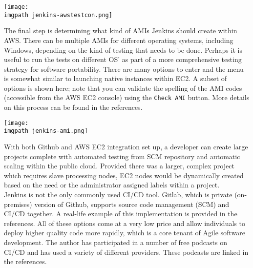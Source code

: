     \begin{minipage}[t]{\linewidth}
	  \centering
      \texttt{[image: \\imgpath jenkins-awstestcon.png]}
    \end{minipage}

The final step is determining what kind of AMIs Jenkins should create within
AWS\@. There can be multiple AMIs for different operating systems, including
Windows, depending on the kind of testing that needs to be done. Perhaps it is
useful to run the tests on different OS' as part of a more comprehensive
testing strategy for software portability. There are many options to enter and
the menu is somewhat similar to launching native instances within EC2. A
subset of options is shown here; note that you can validate the spelling of
the AMI codes (accessible from the AWS EC2 console) using the \verb|Check AMI|
button. More details on this process can be found in the references.

    \begin{minipage}[t]{\linewidth}
	  \centering
      \texttt{[image: \\imgpath jenkins-ami.png]}
    \end{minipage}

With both Github and AWS EC2 integration set up, a developer can create large
projects complete with automated testing from SCM repository and automatic
scaling within the public cloud. Provided there was a larger, complex project
which requires slave processing nodes, EC2 nodes would be dynamically created
based on the need or the administrator assigned labels within a project. \\

Jenkins is not the only commonly used CI/CD tool. Gitlab, which is private
(on-premises) version of Github, supports source code management (SCM) and
CI/CD together. A real-life example of this implementation is provided in the
references. All of these options come at a very low price and allow
individuals to deploy higher quality code more rapidly, which is a core tenant
of Agile software development. The author has participated in a number of free
podcasts on CI/CD and has used a variety of different providers. These podcasts
are linked in the references.
